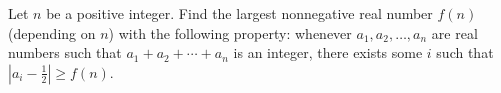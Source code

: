 Let $n$ be a positive integer. Find the largest nonnegative real number $f(n)$ (depending on $n$) with the following property: whenever $a_1,a_2,\ldots,a_n$ are real numbers such that $a_1+a_2+\cdots +a_n$ is an integer, there exists some $i$ such that  $\left|a_i-\frac{1}{2}\right|\ge f(n)$.